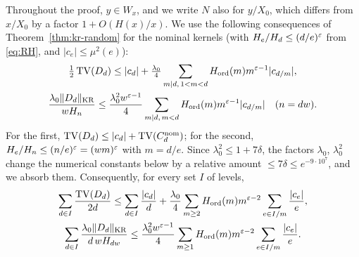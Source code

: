 Throughout the proof, $y\in W_x$, and we write $N$ also for $y/X_0$, which differs from $x/X_0$ by a factor
$1+O(H(x)/x)$. We use the following consequences of Theorem~\ref{thm:kr-random} for the nominal kernels (with
$H_e/H_d\le(d/e)^\varepsilon$ from \eqref{eq:RH}, and $|c_e|\le\mu^2(e)$):
\begin{equation}\label{eq:TVD-bounds}
\begin{gathered}
  \tfrac12\operatorname{TV}(D_d)\le|c_d|+\tfrac{\lambda_0}4\sum_{m\mid d,\,1<m<d}H_{\mathrm{ord}}(m)m^{\varepsilon-1}|c_{d/m}|,\\
  \frac{\lambda_0\lVert D_d\rVert_{\mathrm{KR}}}{wH_n}\le\frac{\lambda_0^2w^{\varepsilon-1}}4\sum_{m\mid d,\,m<d}H_{\mathrm{ord}}(m)m^{\varepsilon-1}|c_{d/m}|\quad(n=dw).
\end{gathered}
\end{equation}
For the first, $\operatorname{TV}(D_d)\le|c_d|+\operatorname{TV}(C_d^{\mathrm{nom}})$; for the second, $H_e/H_n\le(n/e)^\varepsilon=(wm)^\varepsilon$ with $m=d/e$. Since
$\lambda_0^2\le1+7\delta$, the factors $\lambda_0$, $\lambda_0^2$ change the numerical constants below by a relative amount
$\le7\delta\le e^{-9\cdot10^7}$, and we absorb them. Consequently, for every set $I$ of levels,
\begin{equation}\label{eq:TVD-sums}
\begin{gathered}
  \sum_{d\in I}\frac{\operatorname{TV}(D_d)}{2d}\le\sum_{d\in I}\frac{|c_d|}d+\frac{\lambda_0}4\sum_{m\ge2}H_{\mathrm{ord}}(m)m^{\varepsilon-2}\sum_{e\in I/m}\frac{|c_e|}e,\\
  \sum_{d\in I}\frac{\lambda_0\lVert D_d\rVert_{\mathrm{KR}}}{d\,wH_{dw}}\le\frac{\lambda_0^2w^{\varepsilon-1}}4\sum_{m\ge1}H_{\mathrm{ord}}(m)m^{\varepsilon-2}\sum_{e\in I/m}\frac{|c_e|}e .
\end{gathered}
\end{equation}

